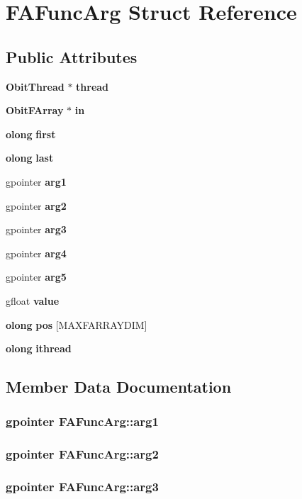 \section{FAFunc\-Arg Struct Reference}
\label{structFAFuncArg}
\subsection*{Public Attributes}
\begin{CompactItemize}
\item 
{\bf Obit\-Thread} $\ast$ {\bf thread}
\item 
{\bf Obit\-FArray} $\ast$ {\bf in}
\item 
{\bf olong} {\bf first}
\item 
{\bf olong} {\bf last}
\item 
gpointer {\bf arg1}
\item 
gpointer {\bf arg2}
\item 
gpointer {\bf arg3}
\item 
gpointer {\bf arg4}
\item 
gpointer {\bf arg5}
\item 
gfloat {\bf value}
\item 
{\bf olong} {\bf pos} [MAXFARRAYDIM]
\item 
{\bf olong} {\bf ithread}
\end{CompactItemize}


\subsection{Member Data Documentation}
\subsubsection{\setlength{\rightskip}{0pt plus 5cm}gpointer {\bf FAFunc\-Arg::arg1}}\label{structFAFuncArg_o4}


\subsubsection{\setlength{\rightskip}{0pt plus 5cm}gpointer {\bf FAFunc\-Arg::arg2}}\label{structFAFuncArg_o5}


\subsubsection{\setlength{\rightskip}{0pt plus 5cm}gpointer {\bf FAFunc\-Arg::arg3}}\label{structFAFuncArg_o6}


